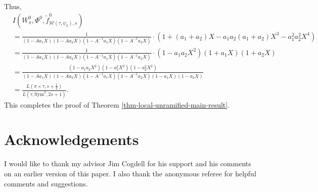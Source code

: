 \documentclass[11pt]{amsart}
\theoremstyle{definition}
\theoremstyle{remark}
\begin{document}
Thus, 
\begin{equation*}
\begin{split}
&I(W_\pi^0, \Phi^0, \tilde{f}^0_{\mathcal{W}(\tau,\psi_2), s} ) \\
&=  \frac{1 }{(1-Aa_1 X)(1-Aa_2 X)(1-A^{-1}a_1 X)(1-A^{-1}a_2 X)} \cdot  \left( 1+(a_1+a_2)X   -a_1 a_2(a_1+a_2)X^3 -a_1^2 a_2^2 X^4   \right)\\
&=  \frac{1 }{(1-Aa_1 X)(1-Aa_2 X)(1-A^{-1}a_1 X)(1-A^{-1}a_2 X)}  \cdot  \left( 1-a_1a_2 X^2  \right) \left( 1+a_1 X \right) \left( 1+a_2 X \right)\\
&=\frac{(1-a_1a_2 X^2 )(1-a_1^2 X^2)(1-a_2^2 X^2) }{(1-Aa_1 X)(1-Aa_2 X)(1-A^{-1}a_1 X)(1-A^{-1}a_2 X) (1-a_1 X)(1-a_2 X)}\\
&=\frac{L(\pi\times \tau, s+\frac{1}{2}) }{L(\tau, \mathrm{Sym}^2, 2s+1)}.
\end{split}
\end{equation*}
This completes the proof of Theorem \ref{thm-local-unramified-main-result}.

\section*{Acknowledgements}

I would like to thank my advisor Jim Cogdell for his support and his comments on an earlier version of this paper. I also thank the anonymous referee for helpful comments and suggestions.
\end{document}
